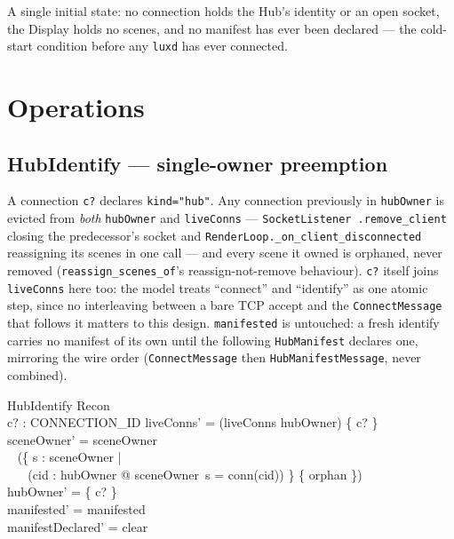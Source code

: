 \documentclass[a4paper,10pt,fleqn]{article}
\begin{document}
A single initial state: no connection holds the Hub's identity or an open
socket, the Display holds no scenes, and no manifest has ever been
declared --- the cold-start condition before any \texttt{luxd} has ever
connected.

\section{Operations}

\subsection{HubIdentify --- single-owner preemption}

A connection \texttt{c?} declares \texttt{kind="hub"}.  Any connection
previously in \texttt{hubOwner} is evicted from \emph{both}
\texttt{hubOwner} and \texttt{liveConns} --- \texttt{SocketListener
.remove\_client} closing the predecessor's socket and
\texttt{RenderLoop.\_on\_client\_disconnected} reassigning its scenes in
one call --- and every scene it owned is orphaned, never removed
(\texttt{reassign\_scenes\_of}'s reassign-not-remove behaviour).  \texttt{c?}
itself joins \texttt{liveConns} here too: the model treats ``connect'' and
``identify'' as one atomic step, since no interleaving between a bare TCP
accept and the \texttt{ConnectMessage} that follows it matters to this
design.  \texttt{manifested} is untouched: a fresh identify carries no
manifest of its own until the following \texttt{HubManifest} declares
one, mirroring the wire order (\texttt{ConnectMessage} then
\texttt{HubManifestMessage}, never combined).

\begin{schema}{HubIdentify}
  \Delta Recon \\
  c? : CONNECTION\_ID
\where
  liveConns' = (liveConns \setminus hubOwner) \cup \{ c? \} \\
  sceneOwner' = sceneOwner \oplus \\
  \quad~ (\{ s : \dom sceneOwner | \\
  \quad~ \quad~ (\exists cid : hubOwner @ sceneOwner~s = conn(cid)) \} \cross \{ orphan \}) \\
  hubOwner' = \{ c? \} \\
  manifested' = manifested \\
  manifestDeclared' = clear
\end{schema}
\end{document}
